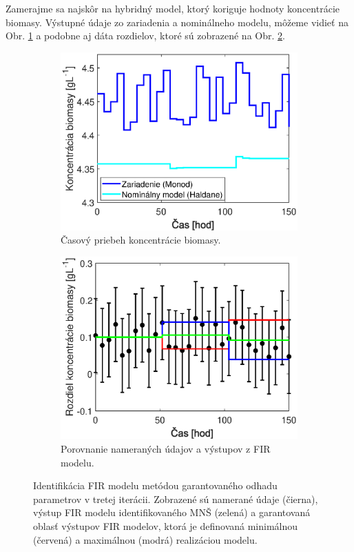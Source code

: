 Zamerajme sa najskôr na hybridný model, ktorý koriguje hodnoty koncentrácie biomasy.  Výstupné údaje zo zariadenia a nominálneho modelu, môžeme vidieť na Obr. \ref{fig:FIR_bio_data} a podobne aj dáta rozdielov, ktoré sú zobrazené na Obr. \ref{fig:FIR_bio_ident}.
\begin{figure}
\centering
	\begin{subfigure}[b]{0.49\textwidth}
		\centering
		\includegraphics[width=\linewidth]{images/FIR_bio_data}
		\caption{Časový priebeh koncentrácie biomasy.\newline}
		\label{fig:FIR_bio_data}
	\end{subfigure}
	\begin{subfigure}[b]{0.49\textwidth}
		\centering
		\includegraphics[width=\linewidth]{images/FIR_bio_ident}
		\caption{Porovnanie nameraných údajov a výstupov z FIR modelu.}
		\label{fig:FIR_bio_ident}
	\end{subfigure}
\caption{Identifikácia FIR modelu metódou garantovaného odhadu parametrov v tretej iterácii. Zobrazené sú namerané údaje (čierna), výstup FIR modelu identifikovaného MNŠ (zelená) a garantovaná oblasť výstupov FIR modelov, ktorá je definovaná minimálnou (červená) a maximálnou (modrá) realizáciou modelu.}
\label{fig:FIR_bio_identification}
\end{figure}

